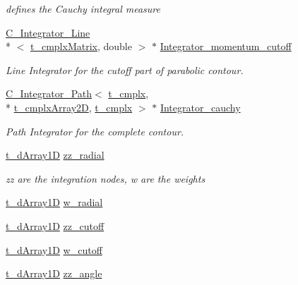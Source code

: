 \begin{DoxyCompactItemize}
\begin{DoxyCompactList}\small\item\em defines the Cauchy integral measure \end{DoxyCompactList}\item 
\hyperlink{class_c___integrator___line}{C\-\_\-\-Integrator\-\_\-\-Line}\\*
$<$ \hyperlink{types_8h_a24d30fabb53c3b88ffb2af3ce415e9df}{t\-\_\-cmplx\-Matrix}, double $>$ $\ast$ \hyperlink{class_c___quark_a551a3fc5de8f8b4d8bcb2502b503df41}{Integrator\-\_\-momentum\-\_\-cutoff}
\begin{DoxyCompactList}\small\item\em Line Integrator for the cutoff part of parabolic contour. \end{DoxyCompactList}\item 
\hyperlink{class_c___integrator___path}{C\-\_\-\-Integrator\-\_\-\-Path}$<$ \hyperlink{types_8h_aa75ae339052372f671bb263e6a272e82}{t\-\_\-cmplx}, \\*
\hyperlink{types_8h_a4db8c78f1689c3a957b2866daaae58f2}{t\-\_\-cmplx\-Array2\-D}, \hyperlink{types_8h_aa75ae339052372f671bb263e6a272e82}{t\-\_\-cmplx} $>$ $\ast$ \hyperlink{class_c___quark_aaa4541680e33e880aa95591e9df3be44}{Integrator\-\_\-cauchy}
\begin{DoxyCompactList}\small\item\em Path Integrator for the complete contour. \end{DoxyCompactList}\item 
\hyperlink{types_8h_a7572e8a35cd6501ce959f177307310a4}{t\-\_\-d\-Array1\-D} \hyperlink{class_c___quark_a6e1d141d7f38aba34e48fd51f4da95de}{zz\-\_\-radial}
\begin{DoxyCompactList}\small\item\em zz are the integration nodes, w are the weights \end{DoxyCompactList}\item 
\hyperlink{types_8h_a7572e8a35cd6501ce959f177307310a4}{t\-\_\-d\-Array1\-D} \hyperlink{class_c___quark_a0b5346b639ac43652861f2210a73676b}{w\-\_\-radial}
\item 
\hyperlink{types_8h_a7572e8a35cd6501ce959f177307310a4}{t\-\_\-d\-Array1\-D} \hyperlink{class_c___quark_a30161deac15ede23a568a44bb34f7f71}{zz\-\_\-cutoff}
\item 
\hyperlink{types_8h_a7572e8a35cd6501ce959f177307310a4}{t\-\_\-d\-Array1\-D} \hyperlink{class_c___quark_a79b610a65184ef9c49ee0f3947154dd2}{w\-\_\-cutoff}
\item 
\hyperlink{types_8h_a7572e8a35cd6501ce959f177307310a4}{t\-\_\-d\-Array1\-D} \hyperlink{class_c___quark_ae52242e8abf3bb67f88ca271960eeab4}{zz\-\_\-angle}

\end{DoxyCompactItemize}

